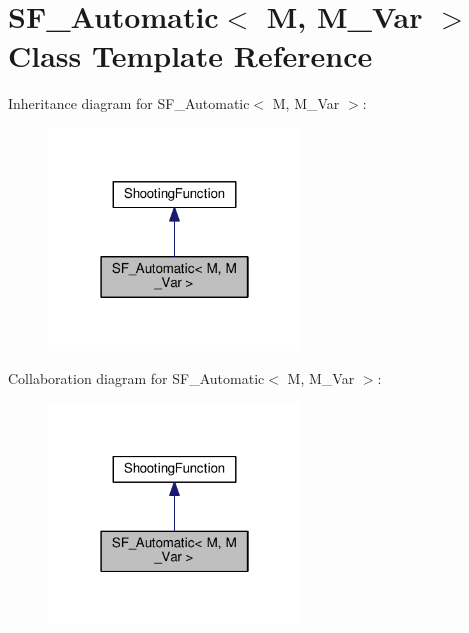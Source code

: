 \hypertarget{classSF__Automatic}{}\section{S\+F\+\_\+\+Automatic$<$ M, M\+\_\+\+Var $>$ Class Template Reference}
\label{classSF__Automatic}


Inheritance diagram for S\+F\+\_\+\+Automatic$<$ M, M\+\_\+\+Var $>$\+:
\nopagebreak
\begin{figure}[H]
\begin{center}
\leavevmode
\includegraphics[width=190pt]{classSF__Automatic__inherit__graph}
\end{center}
\end{figure}


Collaboration diagram for S\+F\+\_\+\+Automatic$<$ M, M\+\_\+\+Var $>$\+:
\nopagebreak
\begin{figure}[H]
\begin{center}
\leavevmode
\includegraphics[width=190pt]{classSF__Automatic__coll__graph}
\end{center}
\end{figure}
